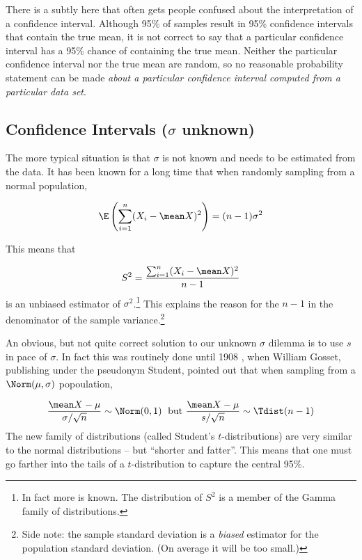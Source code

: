 \documentclass[twoside]{book}\usepackage[]{graphicx}\usepackage[]{xcolor}
\begin{document}
There is a subtly here that often gets people confused about the interpretation
of a confidence interval.  Although 95\% of samples result in 95\% confidence
intervals that contain the true mean, it is not correct to say that a particular 
confidence interval has a 95\% chance of containing the true mean.  Neither the 
particular confidence interval nor the true mean are random, so no reasonable
probability statement can be made \emph{about a particular confidence interval
computed from a particular data set}.

\subsection{Confidence Intervals ($\sigma$ unknown)}

The more typical situation is that $\sigma$ is not known and needs to be estimated 
from the data.  It has been known for a long time that when randomly sampling 
from a normal population,

\[
\E\left( \sum_{i = 1}^n (X_i - \mean X)^2 \right) = (n-1) \sigma^2
\]

This means that 

\[
S^2 = \frac{ \sum_{i = 1}^n (X_i - \mean X)^2 }{n-1}
\]
is an unbiased estimator of $\sigma^2$.\footnote{In fact more is known.  The
distribution of $S^2$ is a member of the Gamma family of distributions.} This
explains the reason for the $n-1$ in the denominator of the sample
variance.\footnote{Side note: the sample standard deviation is a \emph{biased}
estimator for the population standard deviation.  (On average it will be too
small.)}

An obvious, but not quite correct solution to our unknown $\sigma$ dilemma is to use
$s$ in pace of $\sigma$.  In fact this was routinely done until 1908 
\cite{Student1908}, 
when William Gosset, publishing under the pseudonym Student, pointed out that 
when sampling from a $\Norm(\mu, \sigma)$ popoulation,

\[
\frac{ \mean X - \mu}{\sigma/\sqrt{n}} \sim \Norm(0,1)
\mbox{\;\ but\ } 
\frac{ \mean X - \mu}{s/\sqrt{n}} \sim \Tdist(n-1)
\]
The new family of distributions (called Student's $t$-distributions) are very 
similar to the normal distributions -- but ``shorter and fatter''.  This means that
one must go farther into the tails of a $t$-distribution to capture the central 95\%.
\end{document}
